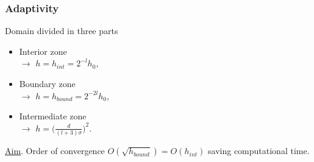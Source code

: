 \begin{frame}
\frametitle{Adaptivity}
\begin{minipage}[0]{0.49\linewidth}
\end{minipage}
\begin{minipage}[0.55]{0.49\linewidth}
Domain divided in three parts
\begin{itemize}
	\item Interior zone \\ $\to$ $h = h_{int} = 2^{-l}h_0$,
	\item Boundary zone \\ $\to$ $h = h_{bound} = 2^{-2l}h_0$,
	\item Intermediate zone \\ $\to$ $h = \Big(\frac{d}{(l + 3)\sigma}\Big)^2$.
\end{itemize}
\end{minipage}

\vspace{1cm}
\underline{Aim}. Order of convergence $O(\sqrt{h_{bound}}) = O(h_{int})$ saving computational time.
\end{frame}

